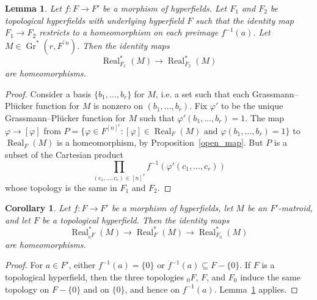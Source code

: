 \documentclass[10pt, preprint]{article}
\newtheorem{corollary}[theorem]{Corollary}
\newtheorem{lemma}[theorem]{Lemma}
\theoremstyle{definition}
\begin{document}
\begin{lemma}
\label{lhomeo}
Let $f:F \to F'$ be a morphism of hyperfields. Let $F_{1}$ and
$F_{2}$ be topological hyperfields with underlying hyperfield $F$ such
that the identity map $F_{1}\to F_{2}$ restricts to a homeomorphism on
each preimage $f^{-1}(a)$. Let $M\in \operatorname{Gr}^{*}(r, F^{\prime \,n})$.
Then the identity maps
%
\begin{equation*}
\operatorname{Real}^{*}_{F_{1}}(M) \to \operatorname{Real}^{*}_{F_{2}}(M)
\end{equation*}
%
are homeomorphisms.
\end{lemma}

\begin{proof}
Consider a basis $\{b_{1}, \ldots , b_{r}\}$ for $M$, i.e. a set such
that each Grassmann--Pl\"{u}cker function for $M$ is nonzero on
$(b_{1}, \ldots , b_{r})$. Fix $\varphi '$ to be the unique
Grassmann--Pl\"{u}cker function for $M$ such that $\varphi '(b_{1},
\ldots , b_{r})=1$. The map $\varphi \to [\varphi ]$ from $P=\{\varphi
\in F^{[n]^{r}}: [\varphi ]\in \operatorname{Real}_{F}(M)\mbox{ and }
\varphi (b_{1}, \ldots , b_{r})=1\}$ to $\operatorname{Real}_{F}(M)$ is
a homeomorphism, by Proposition~\ref{open_map}. But $P$ is a subset of
the Cartesian product
%
\begin{equation*}
\prod _{(c_{1}, \ldots , c_{r})\in [n]^{r}}f^{-1}(\varphi '(c_{1},
\ldots ,c_{r}))
\end{equation*}
%
whose topology is the same in $F_{1}$ and $F_{2}$.
\end{proof}

\begin{corollary}
\label{chomeo}
Let $f:F \to F'$ be a morphism of hyperfields, let $M$ be an
$F'$-matroid, and let $F$ be a topological hyperfield. Then the identity
maps
%
\begin{equation*}
\operatorname{Real}^{*}_{{_{0}F}}(M) \to \operatorname{Real}^{*}_{F}(M)
\to \operatorname{Real}^{*}_{F_{0}}(M)
\end{equation*}
%
are homeomorphisms.
\end{corollary}

\begin{proof}
For $a \in F'$, either $f^{-1}(a) = \{0\}$ or $f^{-1}(a) \subseteq F -
\{0\}$. If $F$ is a topological hyperfield, then the three topologies
${}_{0}F$, $F$, and $F_{0}$ induce the same topology on $F-\{0\}$ and
on $\{0\}$, and hence on $f^{-1}(a)$. Lemma~\ref{lhomeo} applies.
\end{proof}
\end{document}
